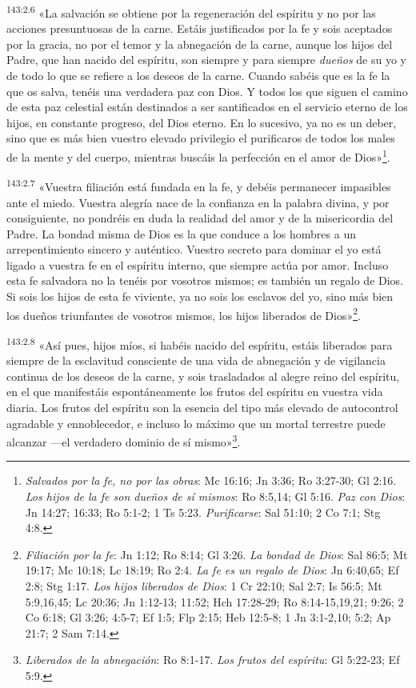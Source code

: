 \par
\textsuperscript{143:2.6} «La salvación se obtiene por la regeneración del espíritu y no por las acciones presuntuosas de la carne. Estáis justificados por la fe y sois aceptados por la gracia, no por el temor y la abnegación de la carne, aunque los hijos del Padre, que han nacido del espíritu, son siempre y para siempre \textit{dueños} de su yo y de todo lo que se refiere a los deseos de la carne. Cuando sabéis que es la fe la que os salva, tenéis una verdadera paz con Dios. Y todos los que siguen el camino de esta paz celestial están destinados a ser santificados en el servicio eterno de los hijos, en constante progreso, del Dios eterno. En lo sucesivo, ya no es un deber, sino que es más bien vuestro elevado privilegio el purificaros de todos los males de la mente y del cuerpo, mientras buscáis la perfección en el amor de Dios»\footnote{\textit{Salvados por la fe, no por las obras}: Mc 16:16; Jn 3:36; Ro 3:27-30; Gl 2:16. \textit{Los hijos de la fe son dueños de sí mismos}: Ro 8:5,14; Gl 5:16. \textit{Paz con Dios}: Jn 14:27; 16:33; Ro 5:1-2; 1 Ts 5:23. \textit{Purificarse}: Sal 51:10; 2 Co 7:1; Stg 4:8.}.

\par
\textsuperscript{143:2.7} «Vuestra filiación está fundada en la fe, y debéis permanecer impasibles ante el miedo. Vuestra alegría nace de la confianza en la palabra divina, y por consiguiente, no pondréis en duda la realidad del amor y de la misericordia del Padre. La bondad misma de Dios es la que conduce a los hombres a un arrepentimiento sincero y auténtico. Vuestro secreto para dominar el yo está ligado a vuestra fe en el espíritu interno, que siempre actúa por amor. Incluso esta fe salvadora no la tenéis por vosotros mismos; es también un regalo de Dios. Si sois los hijos de esta fe viviente, ya no sois los esclavos del yo, sino más bien los dueños triunfantes de vosotros mismos, los hijos liberados de Dios»\footnote{\textit{Filiación por la fe}: Jn 1:12; Ro 8:14; Gl 3:26. \textit{La bondad de Dios}: Sal 86:5; Mt 19:17; Mc 10:18; Lc 18:19; Ro 2:4. \textit{La fe es un regalo de Dios}: Jn 6:40,65; Ef 2:8; Stg 1:17. \textit{Los hijos liberados de Dios}: 1 Cr 22:10; Sal 2:7; Is 56:5; Mt 5:9,16,45; Lc 20:36; Jn 1:12-13; 11:52; Hch 17:28-29; Ro 8:14-15,19,21; 9:26; 2 Co 6:18; Gl 3:26; 4:5-7; Ef 1:5; Flp 2:15; Heb 12:5-8; 1 Jn 3:1-2,10; 5:2; Ap 21:7; 2 Sam 7:14.}.

\par
\textsuperscript{143:2.8} «Así pues, hijos míos, si habéis nacido del espíritu, estáis liberados para siempre de la esclavitud consciente de una vida de abnegación y de vigilancia continua de los deseos de la carne, y sois trasladados al alegre reino del espíritu, en el que manifestáis espontáneamente los frutos del espíritu en vuestra vida diaria. Los frutos del espíritu son la esencia del tipo más elevado de autocontrol agradable y ennoblecedor, e incluso lo máximo que un mortal terrestre puede alcanzar ---el verdadero dominio de sí mismo»\footnote{\textit{Liberados de la abnegación}: Ro 8:1-17. \textit{Los frutos del espíritu}: Gl 5:22-23; Ef 5:9.}.

